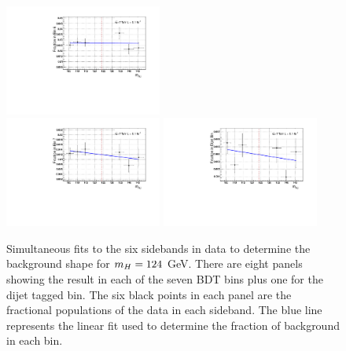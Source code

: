 \begin{figure}
\begin{center}
  \includegraphics[width=0.46\textwidth]{hgg7TeV/sidebandMvaPlots/fits/m124_bg_bdt_bin_6}\\
  \includegraphics[width=0.46\textwidth]{hgg7TeV/sidebandMvaPlots/fits/m124_bg_bdt_bin_7}
  \includegraphics[width=0.46\textwidth]{hgg7TeV/sidebandMvaPlots/fits/m124_bg_bdt_bin_8}
 \end{center}
 \caption{Simultaneous fits to the six sidebands in data to determine the background shape for 
$m_{H}=124$ GeV. There are eight panels showing the result in each of the seven BDT bins plus one for 
the dijet tagged bin. The six black points in each panel are the fractional populations 
of the data in each sideband. The blue line represents the linear fit used to determine the fraction
of background in each bin.}
 \label{fig:examplesbfits}
\end{figure}

